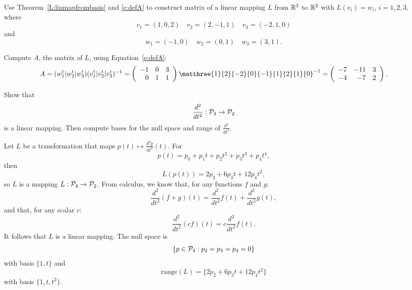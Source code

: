 \documentclass{article}
\begin{document}
\begin{exercise} \label{c7.2.1}
Use Theorem~\ref{L:linmapfrombasis} and \eqref{e:defA} to 
construct matrix of a linear mapping $L$ from $\mathbb R^3$ to $\mathbb R^2$ with $L(v_i)=w_i$, $i=1,2,3$, where
\[
v_1=(1,0,2)\quad v_2=(2,-1,1) \quad v_3=(-2,1,0)
\]
and
\[
w_1=(-1,0) \quad w_2=(0,1) \quad w_3=(3,1).
\]

\begin{solution}

\soln
Compute $A$, the matrix of $L$, using Equation~\eqref{e:defA}:
\[ A = (w_1^t|w_2^t|w_3^t)(v_1^t|v_2^t|v_3^t)^{-1} =
\left(\begin{array}{rrr} -1 & 0 & 3 \\ 0 & 1 & 1 \end{array}\right)
\matthree{1}{2}{-2}{0}{-1}{1}{2}{1}{0}^{-1} =
\left(\begin{array}{rrr} -7 & -11 & 3 \\ -4 & -7 & 2
\end{array}\right). \]

\end{solution}
\end{exercise}





\problemlabel

\begin{exercise}  \label{A8.1.1}
Show that
\[
\frac{d^2}{dt^2}:{\cal P}_4\to{\cal P}_2
\]
is a linear mapping.  Then compute bases for the null space  
and range of $\frac{d^2}{dt^2}$.

\begin{solution}

\soln Let $L$ be a transformation that maps $p(t) \mapsto
\frac{d^2p}{dt^2}(t)$.  For 
\[
p(t) =  p_0 + p_1t + p_2t^2 + p_3t^3+p_4t^4,
\]
then
\[
L(p(t)) = 2p_2 + 6p_3t + 12p_4t^2,
\]
so $L$ is a mapping $L:{\cal P}_4 \rightarrow {\cal P}_2$.  From calculus, we
know that, for any functions $f$ and $g$:
\[ 
\frac{d^2}{dt^2}(f + g)(t) = \frac{d^2}{dt^2}f(t) + \frac{d^2}{dt^2}g(t), 
\]
and that, for any scalar $c$:
\[ 
\frac{d^2}{dt^2}(cf)(t) = c\frac{d^2}{dt^2}f(t). 
\]
It follows that $L$ is a linear mapping.  The null space is
\[
\{p\in  {\cal P}_4: p_2=p_3=p_4=0\} 
\]
with basis $\{1,t\}$ and 
\[
\text{range}(L) =\{2p_2 + 6p_3 t +12 p_4 t^2\} 
\]
with basis $\{1,t,t^2\}$.
\end{solution}
\end{exercise}
\end{document}
